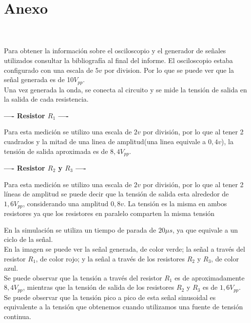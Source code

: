 \saltoPag{}
\section{Anexo}
    \\
    \\ 
    \sangria{} Para obtener la información sobre el osciloscopio y el generador de señales utilizados consultar la bibliografía al final del informe.
    \sangria{} El osciloscopio estaba configurado con una escala de $5v$ por division. Por lo que se puede ver que la señal generada es de 10$V_{pp}$.
    \\
    \sangria{} Una vez generada la onda, se conecta al circuito y se mide la tensión de salida en la salida de cada resistencia.
    \begin{center} \textbf{---- Resistor $R_1$ ----} \end{center}
    \sangria{} Para esta medición se utilizo una escala de $2v$ por división, por lo que al tener 2 cuadrados y la mitad de una linea de amplitud(una linea equivale a $0,4v$), la tensión de salida aproximada es de $8,4V_{pp}$.
    \columnbreak{}
    \begin{center} \textbf{---- Resistor $R_2$ y $R_3$ ----} \end{center}
    \sangria{} Para esta medición se utilizo una escala de $2v$ por división, por lo que al tener 2 líneas de amplitud se puede decir que la tensión de salida esta alrededor de $1,6V_{pp}$, considerando una amplitud $0,8v$. La tensión es la misma en ambos resistores ya que los resistores en paralelo comparten la misma tensión

    \sangria{} En la simulación se utiliza un tiempo de parada de $20\mu s$, ya que equivale a un ciclo de la señal.\\
    \sangria{} En la imagen se puede ver la señal generada, de color verde; la señal a través del resistor 
    $R_1$, de color rojo; y la señal a través de los resistores $R_2$ y $R_3$, de color azul. \\
    \sangria{} Se puede observar que la tensión a través del resistor $R_1$ es de aproximadamente $8,4V_{pp}$, mientras que la tensión de salida de los resistores $R_2$ y $R_3$ es de $1,6V_{pp}$.
    \saltoPag{}
    \sangria{} Se puede observar que la tensión pico a pico de esta señal sinusoidal es equivalente a la tensión que obtenemos cuando utilizamos una fuente de tensión continua. \\

